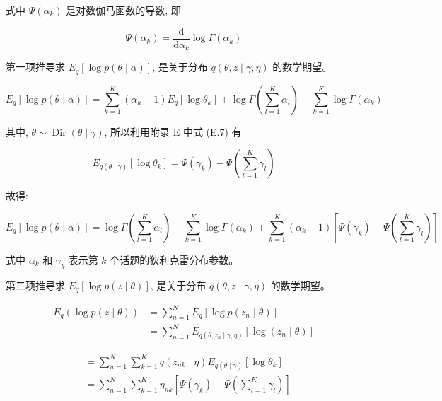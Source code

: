 \documentclass[10pt]{article}
\begin{document}
\begin{CJK*}{UTF8}{bsmi}
式中 $\Psi\left(\alpha_{k}\right)$ 是对数伽马函数的导数, 即


\begin{equation*}
\Psi\left(\alpha_{k}\right)=\frac{\mathrm{d}}{\mathrm{d} \alpha_{k}} \log \Gamma\left(\alpha_{k}\right) \tag{20.48}
\end{equation*}


第一项推导求 $E_{q}[\log p(\theta \mid \alpha)]$, 是关于分布 $q(\theta, z \mid \gamma, \eta)$ 的数学期望。


\begin{equation*}
E_{q}[\log p(\theta \mid \alpha)]=\sum_{k=1}^{K}\left(\alpha_{k}-1\right) E_{q}\left[\log \theta_{k}\right]+\log \Gamma\left(\sum_{l=1}^{K} \alpha_{l}\right)-\sum_{k=1}^{K} \log \Gamma\left(\alpha_{k}\right) \tag{20.49}
\end{equation*}


其中, $\theta \sim \operatorname{Dir}(\theta \mid \gamma)$, 所以利用附录 $\mathrm{E}$ 中式 (E.7) 有


\begin{equation*}
E_{q(\theta \mid \gamma)}\left[\log \theta_{k}\right]=\Psi\left(\gamma_{k}\right)-\Psi\left(\sum_{l=1}^{K} \gamma_{l}\right) \tag{20.50}
\end{equation*}


故得:


\begin{equation*}
E_{q}[\log p(\theta \mid \alpha)]=\log \Gamma\left(\sum_{l=1}^{K} \alpha_{l}\right)-\sum_{k=1}^{K} \log \Gamma\left(\alpha_{k}\right)+\sum_{k=1}^{K}\left(\alpha_{k}-1\right)\left[\Psi\left(\gamma_{k}\right)-\Psi\left(\sum_{l=1}^{K} \gamma_{l}\right)\right] \tag{20.51}
\end{equation*}


式中 $\alpha_{k}$ 和 $\gamma_{k}$ 表示第 $k$ 个话题的狄利克雷分布参数。

第二项推导求 $E_{q}[\log p(z \mid \theta)]$, 是关于分布 $q(\theta, z \mid \gamma, \eta)$ 的数学期望。

$$
\begin{aligned}
E_{q}(\log p(z \mid \theta)) & =\sum_{n=1}^{N} E_{q}\left[\log p\left(z_{n} \mid \theta\right)\right] \\
& =\sum_{n=1}^{N} E_{q\left(\theta, z_{n} \mid \gamma, \eta\right)}\left[\log \left(z_{n} \mid \theta\right)\right]
\end{aligned}
$$


\begin{align*}
& =\sum_{n=1}^{N} \sum_{k=1}^{K} q\left(z_{n k} \mid \eta\right) E_{q(\theta \mid \gamma)}\left[\log \theta_{k}\right] \\
& =\sum_{n=1}^{N} \sum_{k=1}^{K} \eta_{n k}\left[\Psi\left(\gamma_{k}\right)-\Psi\left(\sum_{l=1}^{K} \gamma_{l}\right)\right] \tag{20.52}
\end{align*}



\end{CJK*}
\end{document}
